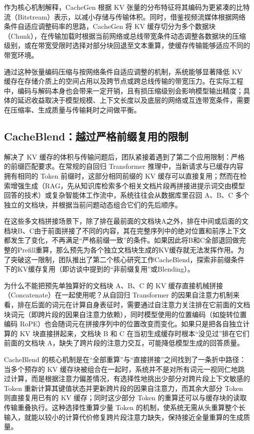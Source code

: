 \documentclass[UTF8,a4paper,11pt,fontset=fandol]{ctexart}
\begin{document}
作为核心机制解释，CacheGen 根据 KV 张量的分布特征将其编码为更紧凑的比特流（Bitstream）表示，以减小存储与传输体积。同时，借鉴视频流媒体根据网络条件自适应调整码率的思路，CacheGen 将 KV 缓存切分为多个数据块（Chunk），在传输加载时根据当前网络或总线带宽条件动态调整各数据块的压缩级别，或在带宽受限时选择对部分块回退至文本重算，使缓存传输能够适应不同的带宽环境。

通过这种张量编码压缩与按网络条件自适应调整的机制，系统能够显著降低 KV 缓存在存储介质上的空间占用以及跨节点或跨总线传输的带宽压力。在实际工程中，编码与解码本身也会带来一定开销，且有损压缩级别会影响模型输出精度；具体的延迟收益取决于模型规模、上下文长度以及底层的网络或互连带宽条件，需要在压缩率、生成质量与传输耗时之间做平衡。

\subsection{CacheBlend：越过严格前缀复用的限制}
解决了 KV 缓存的体积与传输问题后，团队紧接着遇到了第二个应用限制：严格的前缀匹配要求。在常规的自回归 Transformer 推理中，当新请求与已缓存内容拥有相同的 Token 前缀时，这部分相同前缀的 KV 缓存可以直接复用；然而在检索增强生成（RAG，先从知识库检索多个相关文档片段再拼接进提示词交由模型回答的技术）或复杂智能体工作流中，系统往往会从数据库里召回 A、B、C 多个独立的文档块，并根据当前问题动态组合它们的先后顺序。

在这些多文档拼接场景下，除了排在最前面的文档块A之外，排在中间或后面的文档块B、C由于前面拼接了不同的内容，其在完整序列中的绝对位置和前序上下文都发生了变化，不再满足“严格前缀一致”的条件。如果因此将B和C全部退回做完整的Prefill重算，那么预先为各个独立文档块生成的KV缓存就无法发挥作用。为了突破这一限制，团队推出了第二个核心研究工作CacheBlend，探索非前缀条件下的KV缓存复用（即访谈中提到的“非前缀复用”或Blending）。

为什么不能把预先单独算好的文档块 A、B、C 的 KV 缓存直接机械拼接（Concatenate）在一起使用呢？从自回归 Transformer 的因果自注意力机制来看，排在后面的词元在计算自身表征时，需要通过自注意力关注排在它前面的文档块词元（即跨片段的因果自注意力依赖），同时模型使用的位置编码（如旋转位置编码 RoPE）也会随词元在拼接序列中的位置改变而变化。如果只是把各自独立计算的 KV 块直接拼起来，文档块 B 和 C 在当初生成缓存时根本“没见过”排在它们前面的文档块 A，缺失了跨片段的注意力交互，可能降低模型生成的回答质量。

CacheBlend 的核心机制是在“全部重算”与“直接拼接”之间找到了一条折中路径：当多个预存的 KV 缓存块被组合在一起时，系统并不是对所有词元一视同仁地跳过计算，而是根据注意力偏差情况，有选择性地挑出少部分对跨片段上下文敏感的 Token 重新计算其键值状态并更新跨片段的因果自注意力，而其余大部分 Token 则直接复用已有的 KV 缓存；同时这少部分 Token 的重算还可以与缓存块的读取传输重叠执行。这种选择性重算少量 Token 的机制，使系统无需从头重算整个长输入，就能以较小的计算代价修复跨片段注意力缺失，保持接近全量重算的生成质量。
\end{document}
